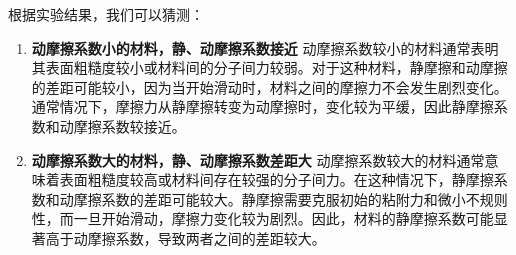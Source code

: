 根据实验结果，我们可以猜测：
\begin{enumerate}
    \item \textbf{动摩擦系数小的材料，静、动摩擦系数接近} 动摩擦系数较小的材料通常表明其表面粗糙度较小或材料间的分子间力较弱。对于这种材料，静摩擦和动摩擦的差距可能较小，因为当开始滑动时，材料之间的摩擦力不会发生剧烈变化。通常情况下，摩擦力从静摩擦转变为动摩擦时，变化较为平缓，因此静摩擦系数和动摩擦系数较接近。
    
    \item \textbf{动摩擦系数大的材料，静、动摩擦系数差距大} 动摩擦系数较大的材料通常意味着表面粗糙度较高或材料间存在较强的分子间力。在这种情况下，静摩擦系数和动摩擦系数的差距可能较大。静摩擦需要克服初始的粘附力和微小不规则性，而一旦开始滑动，摩擦力变化较为剧烈。因此，材料的静摩擦系数可能显著高于动摩擦系数，导致两者之间的差距较大。
    
\end{enumerate}